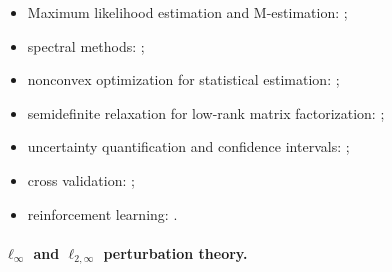 \begin{itemize}
	\item Maximum likelihood estimation and M-estimation: \citet{el2013robust,el2015impact,lei2018asymptotics,sur2019likelihood,sur2019modern,chen2017spectral,chen2020partial};
	\item spectral methods: \citet{chen2017spectral,abbe2020entrywise,ma2017implicit,cai2019subspace,lei2019unified,abbe2020ell_p,ling2020near,chen2020partial};
	\item nonconvex optimization for statistical estimation: \citet{ma2017implicit,chen2019gradient, li2019nonconvex,chen2020nonconvex,cai2019tensor,dong2018nonconvex,chen2020convex,wang2021entrywise};
	\item semidefinite relaxation for low-rank matrix factorization: \citet{zhong2017near,ding2020leave,chen2020noisy,chen2020bridging,chen2020convex};
	\item uncertainty quantification and  confidence intervals: \citet{javanmard2018debiasing,chen2019inference,cai2020uncertainty,yan2021inference};
	\item cross validation: \citet{xu2019consistent};
	\item reinforcement learning: \citet{agarwal2020model,li2020breaking,pananjady2020instance,zhang2020model,cui2020minimax,
		wang2021sample}.
\end{itemize}



\paragraph{$\ell_{\infty}$ and $\ell_{2,\infty}$  perturbation theory.}


